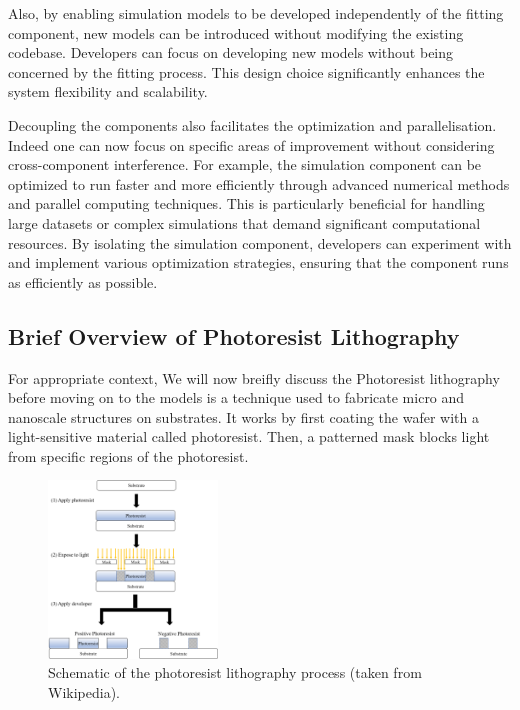 \medskip

Also, by enabling simulation models to be developed independently of the fitting component, 
new models can be introduced without modifying the existing codebase. Developers can 
focus on developing new models without being concerned by the fitting process. 
This design choice significantly enhances the system flexibility and scalability.

\medskip

Decoupling the components also facilitates the optimization and parallelisation. Indeed one can now focus on specific areas of improvement without
considering cross-component interference. For example, the simulation component can be optimized to
run faster and more efficiently through advanced numerical methods and parallel 
computing techniques. This is particularly beneficial for handling large datasets or complex simulations that demand significant 
computational resources. By isolating the simulation component, developers can experiment with and implement various optimization strategies, 
ensuring that the component runs as efficiently as possible.

\medskip

\subsection{Brief Overview of Photoresist Lithography}

For appropriate context, We will now breifly discuss the Photoresist lithography before moving
 on to the models is a technique used to fabricate micro and nanoscale structures on substrates.
It works by first coating the wafer with a light-sensitive material called photoresist. 
Then, a patterned mask blocks light from specific regions of the photoresist.

\begin{figure}[h]
\centering
\includegraphics[width=0.4\textwidth]{images/photo_resist.png}
\caption{Schematic of the photoresist lithography process (taken from Wikipedia).}
\label{fig:photo_resist}
\end{figure}

